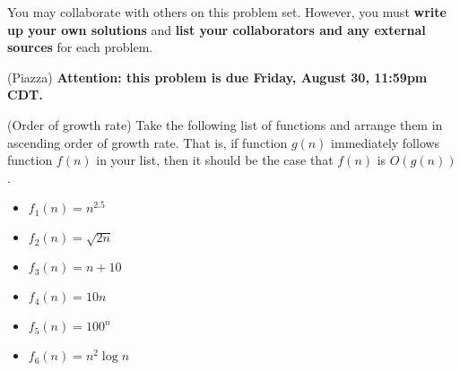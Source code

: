 \noindent You may collaborate with others on this problem set.
However, you must \textbf{{write up your own solutions}} and
\textbf{{list your collaborators and any external sources}} for each
problem.

\medskip

\begin{questions}

  \question (Piazza) \textbf{Attention: this problem is due Friday,
    August 30, 11:59pm CDT.}

\question[10] (Order of growth rate) Take the following list of functions and arrange them in
  ascending order of growth rate. That is, if function $g(n)$
  immediately follows function $f(n)$ in your list, then it should be
  the case that $f(n)$ is $O(g(n))$.
  \begin{itemize}
  \item $f_1(n) = n^{2.5}$
  \item $f_2(n) = \sqrt{2n}$
  \item $f_3(n)=n+10$
  \item $f_4(n) = 10n$
  \item $f_5(n) = 100^n$
  \item $f_6(n) = n^2 \log n$
  \end{itemize}



\end{questions}
